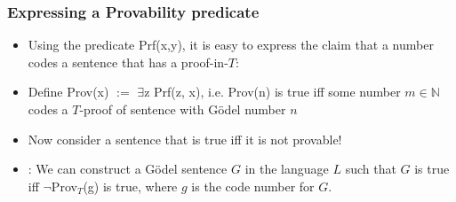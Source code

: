 \begin{frame}
\frametitle{Expressing a Provability predicate}

\begin{itemize}[<+->]

\item Using the predicate \textrm{Prf(x,y)}, it is easy to express the claim that a number codes a sentence that has a proof-in-$T$:

\item Define \textrm{Prov(x)} $:=$ $\exists$\textrm{z Prf(z, x)}, i.e. \textrm{Prov(n)} is true iff some number $m \in \mathbb{N}$ codes a $T$-proof of sentence with G\"odel number $n$

\item Now consider a sentence that is true iff it is not provable!

\item {}: We can construct a G\"odel sentence $G$ in the language $L$ such that $G$ is true iff $\neg$\textrm{Prov}$_T$(g) is true, where $g$ is the code number for $G$.  



\end{itemize}
\end{frame}

